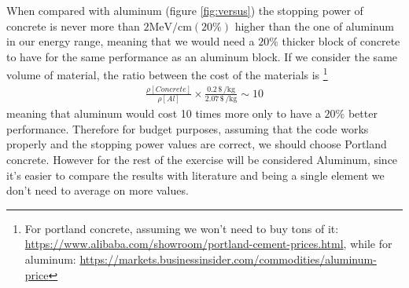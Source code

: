 \documentclass[10pt,a4paper]{article}
\begin{document}
\begin{enumerate}
When compared with aluminum (figure \ref{fig:versus}) the stopping power of concrete is never more than $2\si{\mega\electronvolt\per\centi\meter}(20\si{\percent})$ higher than the one of aluminum in our energy range,  meaning that we would need a $20\%$ thicker block of concrete to have for the same performance as an aluminum block. If we consider the same volume of material, the ratio between the cost of the materials is \footnote{For portland concrete, assuming we won't need to buy tons of it: \url{https://www.alibaba.com/showroom/portland-cement-prices.html}, while for aluminum: \url{https://markets.businessinsider.com/commodities/aluminum-price}}
\begin{align*}
\frac{\rho[Concrete]}{\rho[Al]}\times\frac{0.2\,\$\,\si{\per\kilo\gram}}{2.07\,\$\,\si{\per\kilo\gram}}\sim 10
\end{align*}
meaning that aluminum would cost 10 times more only to have a $20\si{\percent}$ better performance. Therefore for budget purposes, assuming that the code works properly and the stopping power values are correct, we should choose Portland concrete. 
However for the rest of the exercise will be considered Aluminum, since it's easier to compare the results with literature and being a single element we don't need to average on more values.


\end{enumerate}
\end{document}
